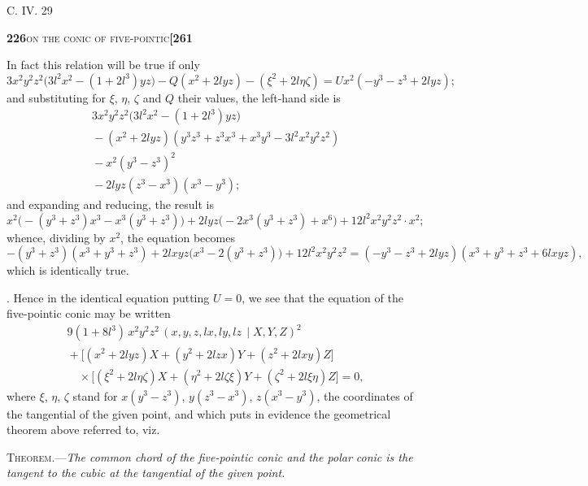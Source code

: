 \documentclass[11pt]{article}
\newcommand{\Cdel}{\mid}
\begin{document}
\hfill C. IV. \hfill 29

\newpage

\noindent\textbf{226}\hfill\textsc{on the conic of five-pointic}\hfill\textbf{[261}

\medskip

\noindent In fact this relation will be true if only
\[
3x^2y^2z^2\bigl(3l^2 x^2 - (1 + 2l^3)yz\bigr) - Q(x^2 + 2lyz) - (\xi^2 + 2l\eta\zeta) = Ux^2(-y^3 - z^3 + 2lyz);
\]
and substituting for $\xi$, $\eta$, $\zeta$ and $Q$ their values, the left-hand side is
\[
\begin{aligned}
&3x^2y^2z^2\bigl(3l^2 x^2 - (1 + 2l^3)yz\bigr)\\
&{}- (x^2 + 2lyz)(y^3z^3 + z^3x^3 + x^3y^3 - 3l^2 x^2y^2z^2)\\
&{}- x^2(y^3 - z^3)^2\\
&{}- 2lyz(z^3 - x^3)(x^3 - y^3);
\end{aligned}
\]
and expanding and reducing, the result is
\[
x^2\bigl(-(y^3 + z^3)x^3 - x^3(y^3 + z^3)\bigr) + 2lyz\bigl(-2x^3(y^3 + z^3) + x^6\bigr) + 12l^2 x^2y^2z^2 \cdot x^2;
\]
whence, dividing by $x^2$, the equation becomes
\[
-(y^3 + z^3)(x^3 + y^3 + z^3) + 2lxyz\bigl(x^3 - 2(y^3 + z^3)\bigr) + 12l^2 x^2y^2z^2
   = (-y^3 - z^3 + 2lyz)(x^3 + y^3 + z^3 + 6lxyz),
\]
which is identically true.

\medskip

. Hence in the identical equation putting $U = 0$, we see that the equation of the five-pointic conic may be written
\[
\begin{aligned}
&9(1 + 8l^3)\,x^2y^2z^2\,(x, y, z, lx, ly, lz\,\Cdel X, Y, Z)^2\\
&{}+ \bigl[(x^2 + 2lyz)X + (y^2 + 2lzx)Y + (z^2 + 2lxy)Z\bigr]\\
&\quad\times \bigl[(\xi^2 + 2l\eta\zeta)X + (\eta^2 + 2l\zeta\xi)Y + (\zeta^2 + 2l\xi\eta)Z\bigr] = 0,
\end{aligned}
\]
where $\xi$, $\eta$, $\zeta$ stand for $x(y^3 - z^3)$, $y(z^3 - x^3)$, $z(x^3 - y^3)$, the coordinates of the tangential of the given point, and which puts in evidence the geometrical theorem above referred to, viz.

\medskip

\noindent\textsc{Theorem.}---\textit{The common chord of the five-pointic conic and the polar conic is the tangent to the cubic at the tangential of the given point.}

\medskip
\end{document}
